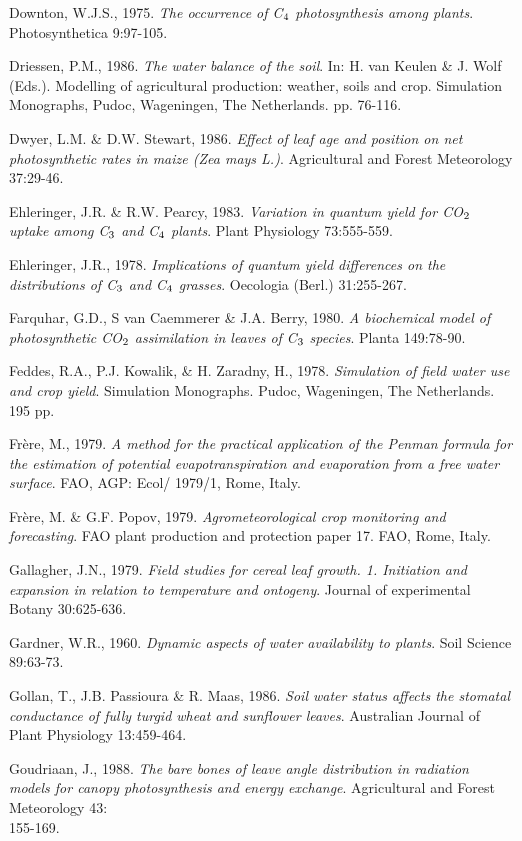 Downton, W.J.S., 1975. {\it The occurrence of C$_{{\rm 4}}$ photosynthesis among plants\/}. Photosynthetica
9:97-105.

Driessen, P.M., 1986. {\it The water balance of the soil\/}. In: H. van Keulen \& J. Wolf (Eds.).
Modelling of agricultural production: weather, soils and crop. Simulation Monographs,
Pudoc, Wageningen, The Netherlands. pp. 76-116.

Dwyer, L.M. \& D.W. Stewart, 1986. {\it Effect of leaf age and position on net photosynthetic
rates in maize (Zea mays L.)\/}. Agricultural and Forest Meteorology 37:29-46.

Ehleringer, J.R. \& R.W. Pearcy, 1983. {\it Variation in quantum yield for CO$_{{\rm 2}}$ uptake among
C$_{{\rm 3}}$ and C$_{{\rm 4}}$ plants\/}. Plant Physiology 73:555-559.

Ehleringer, J.R., 1978. {\it Implications of quantum yield differences on the distributions of C$_{{\rm 3}}$
and C$_{{\rm 4}}$ grasses\/}. Oecologia (Berl.) 31:255-267.

Farquhar, G.D., S van Caemmerer \& J.A. Berry, 1980. {\it A biochemical model of
photosynthetic CO$_{{\rm 2}}$ assimilation in leaves of C$_{{\rm 3}}$ species\/}. Planta 149:78-90.

Feddes, R.A., P.J. Kowalik, \& H. Zaradny, H., 1978. {\it Simulation of field water use and
crop yield\/}. Simulation Monographs. Pudoc, Wageningen, The Netherlands. 195 pp.

Fr\`{e}re, M., 1979. {\it A method for the practical application of the Penman formula for the
estimation of potential evapotranspiration and evaporation from a free water surface\/}. FAO,
AGP: Ecol/ 1979/1, Rome, Italy.

Fr\`{e}re, M. \& G.F. Popov, 1979. {\it Agrometeorological crop monitoring and forecasting\/}. FAO
plant production and protection paper 17. FAO, Rome, Italy.

Gallagher, J.N., 1979. {\it Field studies for cereal leaf growth. 1. Initiation and expansion in
relation to temperature and ontogeny\/}. Journal of experimental Botany 30:625-636.

Gardner, W.R., 1960. {\it Dynamic aspects of water availability to plants\/}. Soil Science 89:63-73.

Gollan, T., J.B. Passioura \& R. Maas, 1986. {\it Soil water status affects the stomatal
conductance of fully turgid wheat and sunflower leaves\/}. Australian Journal of Plant
Physiology 13:459-464.

Goudriaan, J., 1988. {\it The bare bones of leave angle distribution in radiation models for
canopy photosynthesis and energy exchange\/}. Agricultural and Forest Meteorology 43:\\
155-169.

